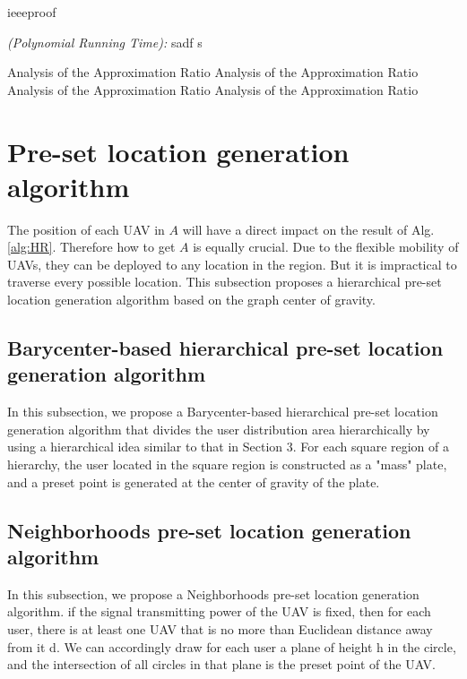\documentclass[journal]{IEEEtran}
\begin{document}
\begin{IEEEproof}
	ieeeproof
	
	
	\emph{(Polynomial Running Time):} sadf s
\end{IEEEproof}
Analysis of the Approximation Ratio
Analysis of the Approximation Ratio
Analysis of the Approximation Ratio
Analysis of the Approximation Ratio

\section{Pre-set location generation algorithm}
The position of each UAV in $A$ will have a direct impact on the result of Alg.\ref{alg:HR}. Therefore how to get $A$ is equally crucial. Due to the flexible mobility of UAVs, they can be deployed to any location in the region. But it is impractical to traverse every possible location. This subsection proposes a hierarchical pre-set location generation algorithm based on the graph center of gravity.



%
\subsection{Barycenter-based hierarchical pre-set location generation algorithm}
In this subsection, we propose a Barycenter-based hierarchical pre-set location generation algorithm that divides the user distribution area hierarchically by using a hierarchical idea similar to that in Section 3. For each square region of a hierarchy, the user located in the square region is constructed as a "mass" plate, and a preset point is generated at the center of gravity of the plate.

\subsection{Neighborhoods pre-set location generation algorithm}
In this subsection, we propose a Neighborhoods pre-set location generation algorithm. if the signal transmitting power of the UAV is fixed, then for each user, there is at least one UAV that is no more than Euclidean distance away from it d. We can accordingly draw for each user a plane of height h in the circle, and the intersection of all circles in that plane is the preset point of the UAV.
\end{document}
